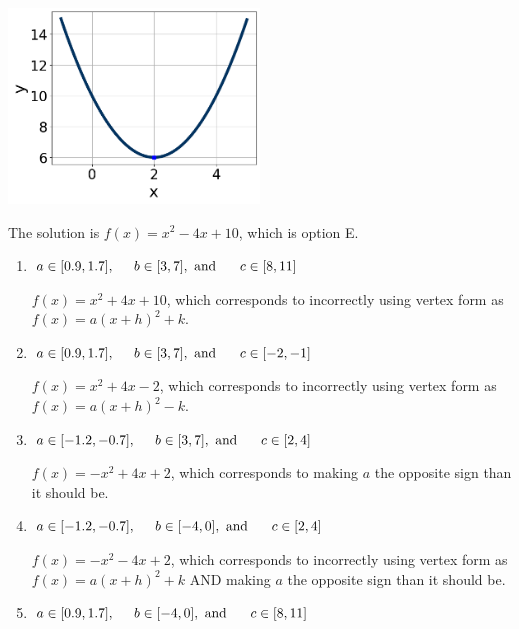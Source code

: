 \documentclass{extbook}[14pt]
\begin{document}
\begin{enumerate}
{\begin{center}
    \includegraphics[width=0.5\textwidth]{../Figures/quadraticGraphToEquationB.png}
\end{center}


The solution is \( f(x) = x^{2} -4 x + 10 \), which is option E.\begin{enumerate}[label=\Alph*.]
\item \( a \in [0.9, 1.7], \hspace*{5mm} b \in [3, 7], \text{ and } \hspace*{5mm} c \in [8, 11] \)

$f(x)=x^{2} +4 x + 10$, which corresponds to incorrectly using vertex form as $f(x) = a(x+h)^2+k$.
\item \( a \in [0.9, 1.7], \hspace*{5mm} b \in [3, 7], \text{ and } \hspace*{5mm} c \in [-2, -1] \)

$f(x)=x^{2} +4 x -2$, which corresponds to incorrectly using vertex form as $f(x) = a(x+h)^2 - k$.
\item \( a \in [-1.2, -0.7], \hspace*{5mm} b \in [3, 7], \text{ and } \hspace*{5mm} c \in [2, 4] \)

$f(x)=-x^{2} +4 x + 2$, which corresponds to making $a$ the opposite sign than it should be.
\item \( a \in [-1.2, -0.7], \hspace*{5mm} b \in [-4, 0], \text{ and } \hspace*{5mm} c \in [2, 4] \)

$f(x)=-x^{2} -4 x + 2$, which corresponds to incorrectly using vertex form as $f(x) = a(x+h)^2+k$ AND making $a$ the opposite sign than it should be.
\item \( a \in [0.9, 1.7], \hspace*{5mm} b \in [-4, 0], \text{ and } \hspace*{5mm} c \in [8, 11] \)


\end{enumerate}}
\end{enumerate}
\end{document}
